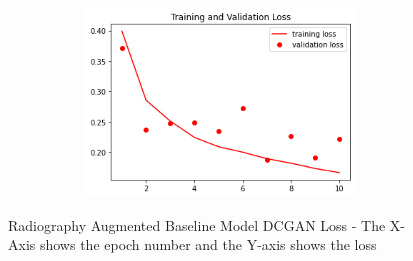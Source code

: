  \begin{figure}[H]
    \centering
    \includegraphics[width=1\textwidth,height=5cm,keepaspectratio]{Images/RadiographyCNNBaselineTrainAndValLossAugmentedDCGAN.png}\\
    \caption{Radiography Augmented Baseline Model DCGAN Loss - The X-Axis shows the epoch number and the Y-axis shows the loss}
    \label{fig:Radiography Augmented Baseline Model DCGAN Loss}
\end{figure}
